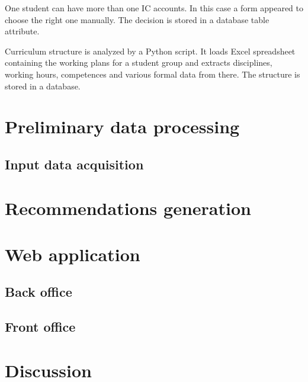 \documentclass[conference]{IEEEtran}
\begin{document}

One student can have more than one IC accounts.  In this case a form appeared to choose the right one manually.  The decision is stored in a database table attribute.

Curriculum structure is analyzed by a Python script.  It loads Excel spreadsheet containing the working plans for a student group and extracts disciplines, working hours, competences and various formal data from there.  The structure is stored in a database.

\section{Preliminary data processing}
\label{sec:relim-proc}


\subsection{Input data acquisition}
\label{sec:tech-input}



\section{Recommendations generation}
\label{sec:proc-recs}

\section{Web application}

\subsection{Back office}
\label{sec:back}

\subsection{Front office}
\label{sec:back}

\section{Discussion}
\label{sec:disc}
\end{document}

